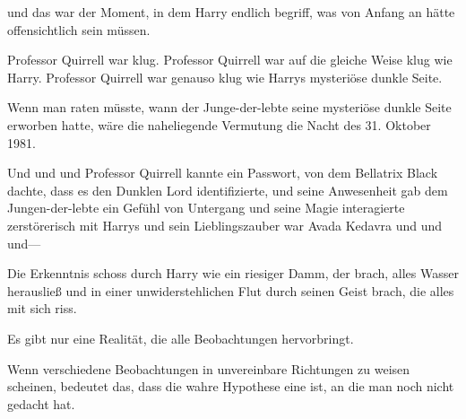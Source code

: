 und das war der Moment, in dem Harry endlich begriff, was von Anfang an hätte offensichtlich sein müssen.

\later

Professor Quirrell war klug.
Professor Quirrell war auf die gleiche Weise klug wie Harry.
Professor Quirrell war genauso klug wie Harrys mysteriöse dunkle Seite.

Wenn man raten müsste, wann der Junge-der-lebte seine mysteriöse dunkle Seite erworben hatte, wäre die naheliegende Vermutung die Nacht des 31. Oktober 1981.

\later

Und und und Professor Quirrell kannte ein Passwort, von dem Bellatrix Black dachte, dass es den Dunklen Lord identifizierte, und seine Anwesenheit gab dem Jungen-der-lebte ein Gefühl von Untergang und seine Magie interagierte zerstörerisch mit Harrys und sein Lieblingszauber war Avada Kedavra und und und—

Die Erkenntnis schoss durch Harry wie ein riesiger Damm, der brach, alles Wasser herausließ und in einer unwiderstehlichen Flut durch seinen Geist brach, die alles mit sich riss.

Es gibt nur eine Realität, die alle Beobachtungen hervorbringt.

Wenn verschiedene Beobachtungen in unvereinbare Richtungen zu weisen scheinen, bedeutet das, dass die wahre Hypothese eine ist, an die man noch nicht gedacht hat.

